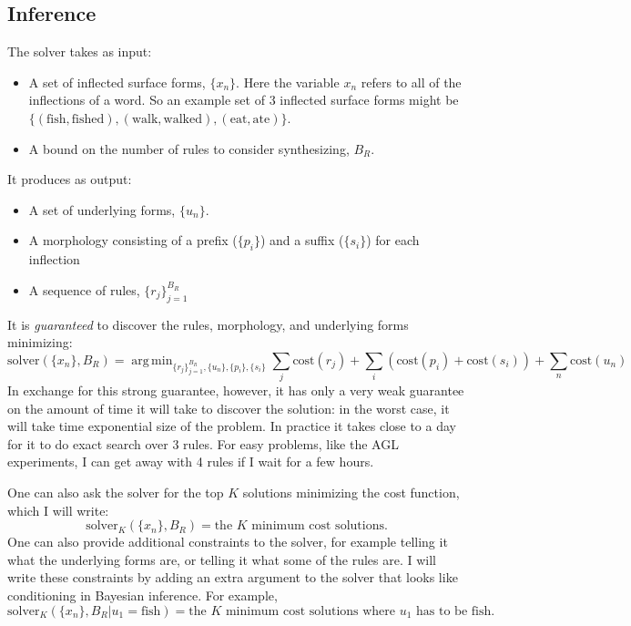 \documentclass{article}
\DeclareMathOperator*{\argmin}{arg\,min}
\begin{document}
\pagebreak
\subsection{Inference}

The solver takes as input:
\begin{itemize}
\item A set of inflected surface forms, $\{x_n\}$. Here the variable $x_n$ refers to all of the inflections of a word. So an example set of 3 inflected surface forms might be $\{(\text{fish},\text{fished}), (\text{walk},\text{walked}), (\text{eat},\text{ate})\}$.
\item A bound on the number of rules to consider synthesizing, $B_R$.
\end{itemize}
It produces as output:
\begin{itemize}
\item A set of underlying forms, $\{u_n\}$.
\item A morphology consisting of a prefix ($\{p_i\}$) and a suffix ($\{s_i\}$)  for each inflection
\item  A sequence of rules, $\{r_j\}_{j = 1}^{B_R}$
\end{itemize}
It is \emph{guaranteed} to discover the rules, morphology, and underlying forms minimizing:
\begin{equation}
  \text{solver}(\{x_n\},B_R) = \argmin_{\{r_j\}_{j = 1}^{B_R}, \{u_n\}, \{p_i\}, \{s_i\}} \sum_j \text{cost}(r_j) + \sum_i (\text{cost}(p_i) + \text{cost}(s_i) ) + \sum_n \text{cost}(u_n)
\end{equation}
In exchange for this strong guarantee, however, it has only a very
weak guarantee on the amount of time it will take to discover the
solution: in the worst case, it will take time exponential size of the
problem. In practice it takes close to a day for it to do exact search over 3 rules.
For easy problems, like the AGL experiments, I can get away with 4 rules if I wait for a few hours.

One can also ask the solver for the top $K$ solutions minimizing the cost function, which I will write:
\begin{equation}
  \text{solver}_K(\{x_n\},B_R) = \text{the }K\text{ minimum cost solutions.}
\end{equation}
One can also provide additional constraints to the solver, for example telling it what the underlying forms are,
or telling it what some of the rules are. I will write these constraints by adding an extra argument to the solver
that looks like conditioning in Bayesian inference. For example,
\begin{equation}
  \text{solver}_K(\{x_n\},B_R|u_1 = \text{fish}) = \text{the }K\text{ minimum cost solutions where }u_1\text{ has to be fish.}
  \end{equation}
\end{document}
